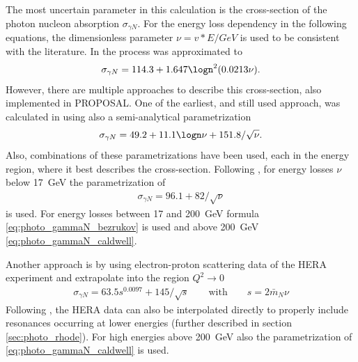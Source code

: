 The most uncertain parameter in this calculation is the cross-section of the photon nucleon absorption $\sigma_{\gamma N}$.
For the energy loss dependency in the following equations, the dimensionless parameter $\nu = v * E / GeV$ is used to be consistent with the literature.
In \cite{Bezrukov81} the process was approximated to
\begin{align} \label{eq:photo_gammaN_bezrukov}
    \sigma_{\gamma N} = 114.3 + 1.647 \logn^2 (0.0213 \nu) .
\end{align}
However, there are multiple approaches to describe this cross-section, also implemented in PROPOSAL.
One of the earliest, and still used approach, was calculated in \cite{Caldwell79} using also a semi-analytical parametrization
\begin{align} \label{eq:photo_gammaN_caldwell}
    \sigma_{\gamma N} = 49.2 + 11.1 \logn \nu + 151.8 / \sqrt{\nu} .
\end{align}
Also, combinations of these parametrizations have been used, each in the energy region, where it best describes the cross-section.
Following \cite{Kokoulin97}, for energy losses $\nu$ below \SI{17}{GeV} the parametrization of \cite{Borog75}
\begin{align}
    \sigma_{\gamma N} = 96.1 + 82 / \sqrt{\nu}
\end{align}
is used. For energy losses between 17 and \SI{200}{GeV} formula \eqref{eq:photo_gammaN_bezrukov} is used and above \SI{200}{GeV} \eqref{eq:photo_gammaN_caldwell}.

Another approach is by using electron-proton scattering data of the HERA experiment and extrapolate into the region $Q^2 \to 0$ \cite{Breitweg99ZEUS}
\begin{align}
    \sigma_{\gamma N} = 63.5 s^{0.0097} + 145 /\sqrt{s}
    \qquad \text{with} \qquad
    s = 2 \bar{m}_N \nu
\end{align}
Following \cite{Rhode93PhD}, the HERA data can also be interpolated directly to properly include resonances occurring at lower energies (further described in section \ref{sec:photo_rhode}). For high energies above \SI{200}{GeV} also the parametrization of \eqref{eq:photo_gammaN_caldwell} is used.


